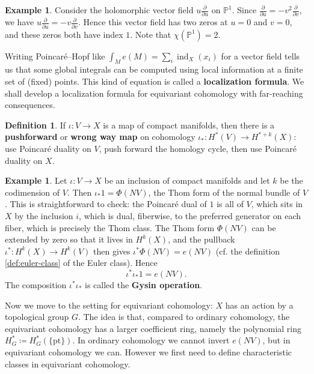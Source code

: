 \documentclass{report}
\theoremstyle{plain}
\theoremstyle{definition}
\newtheorem{definition}[theorem]{Definition}
\newtheorem{example}[theorem]{Example}
\theoremstyle{remark}
\newcommand{\bP}{\mathbb{P}}
\DeclareMathOperator{\ind}{ind}
\newcommand{\pt}{\mathrm{pt}}
\newcommand{\pder}[2]{\frac{\partial #1}{\partial #2}}
\begin{document}
\begin{example}
  Consider the holomorphic vector field $u \pder{}{u}$ on $\bP^1$.
  Since $\pder{}{u} = -v^2 \pder{}{v}$, we have $u \pder{}{u} = -v
  \pder{}{v}$. Hence this vector field has two zeros at $u = 0$ and $v
  = 0$, and these zeros both have index $1$. Note that $\chi(\bP^1) =
  2$.
\end{example}

Writing Poincar\'e--Hopf like $\int_M e(M) = \sum_i \ind_X(x_i)$ for a
vector field tells us that some global integrals can be computed using
local information at a finite set of (fixed) points. This kind of
equation is called a {\bf localization formula}. We shall develop a
localization formula for equivariant cohomology with far-reaching
consequences.

\begin{definition}
  If $\iota\colon V \to X$ is a map of compact manifolds, then there
  is a {\bf pushforward} or {\bf wrong way map} on cohomology
  $\iota_*\colon H^*(V) \to H^{*+k}(X)$: use Poincar\'e duality on
  $V$, push forward the homology cycle, then use Poincar\'e duality on
  $X$.
\end{definition}

\begin{example}
  Let $\iota\colon V \to X$ be an inclusion of compact manifolds and
  let $k$ be the codimension of $V$. Then $\iota_*1 = \Phi(NV)$, the
  Thom form of the normal bundle of $V$. This is straightforward to
  check: the Poincar\'e dual of $1$ is all of $V$, which sits in $X$
  by the inclusion $i$, which is dual, fiberwise, to the preferred
  generator on each fiber, which is precisely the Thom class. The Thom
  form $\Phi(NV)$ can be extended by zero so that it lives in
  $H^k(X)$, and the pullback $\iota^*\colon H^k(X) \to H^k(V)$ then
  gives $\iota^*\Phi(NV) = e(NV)$ (cf. the definition
  \ref{def:euler-class} of the Euler class). Hence
  \[ \iota^* \iota_* 1 = e(NV). \]
  The composition $\iota^*\iota_*$ is called the {\bf Gysin operation}.
\end{example}

Now we move to the setting for equivariant cohomology: $X$ has an
action by a topological group $G$. The idea is that, compared to
ordinary cohomology, the equivariant cohomology has a larger
coefficient ring, namely the polynomial ring $H^*_G \coloneqq
H^*_G(\{\pt\})$. In ordinary cohomology we cannot invert $e(NV)$, but
in equivariant cohomology we can. However we first need to define
characteristic classes in equivariant cohomology.
\end{document}
